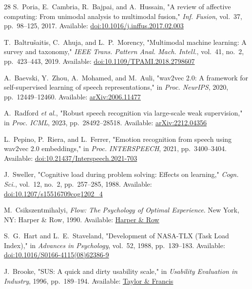 \documentclass[journal,10pt,twocolumn]{IEEEtran}
\begin{document}
\begin{thebibliography}{28}
 S.~Poria, E.~Cambria, R.~Bajpai, and A.~Hussain, "A review of affective computing: From unimodal analysis to multimodal fusion," \textit{Inf. Fusion}, vol.~37, pp.~98--125, 2017. Available: \href{https://doi.org/10.1016/j.inffus.2017.02.003}{doi:10.1016/j.inffus.2017.02.003}

 T.~Baltrušaitis, C.~Ahuja, and L.~P.~Morency, "Multimodal machine learning: A survey and taxonomy," \textit{IEEE Trans. Pattern Anal. Mach. Intell.}, vol.~41, no.~2, pp.~423--443, 2019. Available: \href{https://doi.org/10.1109/TPAMI.2018.2798607}{doi:10.1109/TPAMI.2018.2798607}

 A.~Baevski, Y.~Zhou, A.~Mohamed, and M.~Auli, "wav2vec 2.0: A framework for self-supervised learning of speech representations," in \textit{Proc. NeurIPS}, 2020, pp.~12449--12460. Available: \href{https://arxiv.org/abs/2006.11477}{arXiv:2006.11477}

 A.~Radford \textit{et al.}, "Robust speech recognition via large-scale weak supervision," in \textit{Proc. ICML}, 2023, pp.~28492--28518. Available: \href{https://doi.org/10.48550/arXiv.2212.04356}{arXiv:2212.04356}

 L.~Pepino, P.~Riera, and L.~Ferrer, "Emotion recognition from speech using wav2vec 2.0 embeddings," in \textit{Proc. INTERSPEECH}, 2021, pp.~3400--3404. Available: \href{https://doi.org/10.21437/Interspeech.2021-703}{doi:10.21437/Interspeech.2021-703}

 J.~Sweller, "Cognitive load during problem solving: Effects on learning," \textit{Cogn. Sci.}, vol.~12, no.~2, pp.~257--285, 1988. Available: \href{https://doi.org/10.1207/s15516709cog1202_4}{doi:10.1207/s15516709cog1202_4}

 M.~Csikszentmihalyi, \textit{Flow: The Psychology of Optimal Experience}. New York, NY: Harper \& Row, 1990. Available: \href{https://www.harpercollins.com/products/flow-mihaly-csikszentmihalyi}{Harper \& Row}

 S.~G.~Hart and L.~E.~Staveland, "Development of NASA-TLX (Task Load Index)," in \textit{Advances in Psychology}, vol.~52, 1988, pp.~139--183. Available: \href{https://doi.org/10.1016/S0166-4115(08)62386-9}{doi:10.1016/S0166-4115(08)62386-9}

 J.~Brooke, "SUS: A quick and dirty usability scale," in \textit{Usability Evaluation in Industry}, 1996, pp.~189--194. Available: \href{https://doi.org/10.1201/9781498710411}{Taylor \& Francis}


\end{thebibliography}
\end{document}

